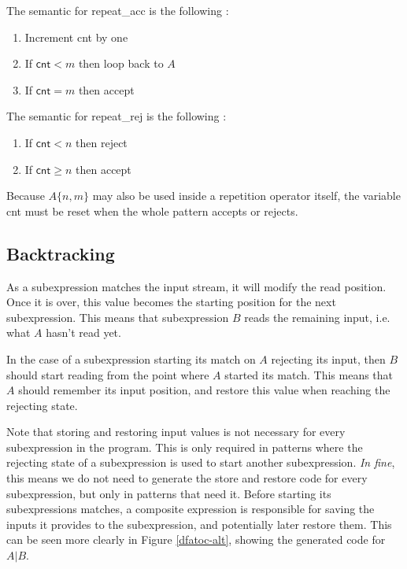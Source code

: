 \documentclass[11pt,a4paper]{report}
\newcommand{\regexp}[1]{$#1$}
\newcommand{\haskell}[1]{\textsf{#1}}
\begin{document}
The semantic for \haskell{repeat\_acc} is the following :
\begin{enumerate}
\item Increment \haskell{cnt} by one
\item If $\haskell{cnt} < m$ then loop back to $A$
\item If $\haskell{cnt} = m$ then accept 
\end{enumerate}

The semantic for \haskell{repeat\_rej} is the following :
\begin{enumerate}
\item If $\haskell{cnt} < n$ then reject
\item If $\haskell{cnt} \geq n$ then accept
\end{enumerate}

Because $A\{n,m\}$ may also be used inside a repetition operator itself, the variable \haskell{cnt} must be reset when the whole pattern accepts or rejects.

\subsection{Backtracking}

\label{backtracking}

As a subexpression matches the input stream, it will modify the read position. Once it is over, this value becomes the starting position for the next subexpression. This means that subexpression $B$ reads the remaining input, i.e. what $A$ hasn't read yet.

In the case of a subexpression starting its match on $A$ rejecting its input, then $B$ should start reading from the point where $A$ started its match. This means that $A$ should remember its input position, and restore this value when reaching the rejecting state.

Note that storing and restoring input values is not necessary for every subexpression in the program. This is only required in patterns where the rejecting state of a subexpression is used to start another subexpression. \textit{In fine}, this means we do not need to generate the store and restore code for every subexpression, but only in patterns that need it. Before starting its subexpressions matches, a composite expression is responsible for saving the inputs it provides to the subexpression, and potentially later restore them. This can be seen more clearly in Figure \ref{dfatoc-alt}, showing the generated code for \regexp{A|B}.
\end{document}
